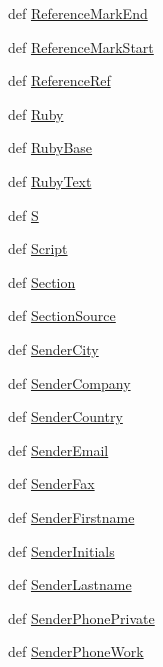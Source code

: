 \begin{DoxyCompactItemize}
\item 
def \hyperlink{namespaceodf_1_1text_a8644c879898a41a8ba029a84af0fadf2}{Reference\+Mark\+End}
\item 
def \hyperlink{namespaceodf_1_1text_a87f8b9497724adb94ee80f979c371b77}{Reference\+Mark\+Start}
\item 
def \hyperlink{namespaceodf_1_1text_a341d7e12d9e38ed19afb758f6defb28b}{Reference\+Ref}
\item 
def \hyperlink{namespaceodf_1_1text_a6c440a41be64b2d1e21ee8d79589988d}{Ruby}
\item 
def \hyperlink{namespaceodf_1_1text_a7b7d39eab3673e0f9fd8c50e7fc24578}{Ruby\+Base}
\item 
def \hyperlink{namespaceodf_1_1text_afe73cde3762dc8f76f42208a754d0a30}{Ruby\+Text}
\item 
def \hyperlink{namespaceodf_1_1text_a9bdcfba7b88daa6dc5419ab4f07b2668}{S}
\item 
def \hyperlink{namespaceodf_1_1text_abe8a4d10c3f95488c1b86b1a52860c0a}{Script}
\item 
def \hyperlink{namespaceodf_1_1text_a91f1e40aa4635109b6304583b1400c17}{Section}
\item 
def \hyperlink{namespaceodf_1_1text_a34b82cda7e9c6f523c9e7d9e113614d1}{Section\+Source}
\item 
def \hyperlink{namespaceodf_1_1text_a74a95eecb3bf21f33e69d216c4dfe3ca}{Sender\+City}
\item 
def \hyperlink{namespaceodf_1_1text_a54ac1fd2bc5b4c0baa0f9155bb8b6aeb}{Sender\+Company}
\item 
def \hyperlink{namespaceodf_1_1text_ade10650be9cd193239b1a77ace3d2c5f}{Sender\+Country}
\item 
def \hyperlink{namespaceodf_1_1text_a99eefd40d4711d9fcc8972633eb6415e}{Sender\+Email}
\item 
def \hyperlink{namespaceodf_1_1text_aea82e7444ba2948a8d14c9ed4581bd8a}{Sender\+Fax}
\item 
def \hyperlink{namespaceodf_1_1text_a92f56bb2853e325435b31df9a3585c64}{Sender\+Firstname}
\item 
def \hyperlink{namespaceodf_1_1text_a01dac566b83a006d43fa4dd4039504a4}{Sender\+Initials}
\item 
def \hyperlink{namespaceodf_1_1text_a32361b2a8418ee42bd636903a6a1e677}{Sender\+Lastname}
\item 
def \hyperlink{namespaceodf_1_1text_a026dc74ef10a3313329727377e8f54a6}{Sender\+Phone\+Private}
\item 
def \hyperlink{namespaceodf_1_1text_a6f9a38371ed94e2a544de0cffd155e63}{Sender\+Phone\+Work}

\end{DoxyCompactItemize}
